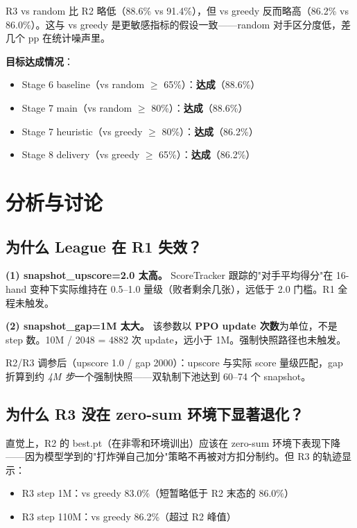 \documentclass[twocolumn,a4paper,10pt]{ctexart}
\begin{document}
R3 vs random 比 R2 略低（88.6\% vs 91.4\%），但 vs greedy 反而略高（86.2\% vs 86.0\%）。这与 vs greedy 是更敏感指标的假设一致——random 对手区分度低，差几个 pp 在统计噪声里。

\textbf{目标达成情况}：

\begin{itemize}[nosep,leftmargin=1.2em]
\item Stage 6 baseline（vs random $\geq$ 65\%）：\textcolor{green!50!black}{\textbf{达成}}（88.6\%）
\item Stage 7 main（vs random $\geq$ 80\%）：\textcolor{green!50!black}{\textbf{达成}}（88.6\%）
\item Stage 7 heuristic（vs greedy $\geq$ 80\%）：\textcolor{green!50!black}{\textbf{达成}}（86.2\%）
\item Stage 8 delivery（vs greedy $\geq$ 65\%）：\textcolor{green!50!black}{\textbf{达成}}（86.2\%）
\end{itemize}

\section{分析与讨论}

\subsection{为什么 League 在 R1 失效？}

\textbf{(1) snapshot\_upscore=2.0 太高。}
ScoreTracker 跟踪的"对手平均得分"在 16-hand 变种下实际维持在 0.5--1.0 量级（败者剩余几张），远低于 2.0 门槛。R1 全程未触发。

\textbf{(2) snapshot\_gap=1M 太大。}
该参数以 \textbf{PPO update 次数}为单位，不是 step 数。10M / 2048 = 4882 次 update，远小于 1M。强制快照路径也未触发。

R2/R3 调参后（upscore 1.0 / gap 2000）：upscore 与实际 score 量级匹配，gap 折算到约 \emph{4M 步}一个强制快照——双轨制下池达到 60--74 个 snapshot。

\subsection{为什么 R3 没在 zero-sum 环境下显著退化？}

直觉上，R2 的 best.pt（在非零和环境训出）应该在 zero-sum 环境下表现下降——因为模型学到的"打炸弹自己加分"策略不再被对方扣分制约。但 R3 的轨迹显示：

\begin{itemize}[nosep,leftmargin=1.2em]
\item R3 step 1M：vs greedy 83.0\%（短暂略低于 R2 末态的 86.0\%）
\item R3 step 110M：vs greedy 86.2\%（超过 R2 峰值）
\end{itemize}
\end{document}
